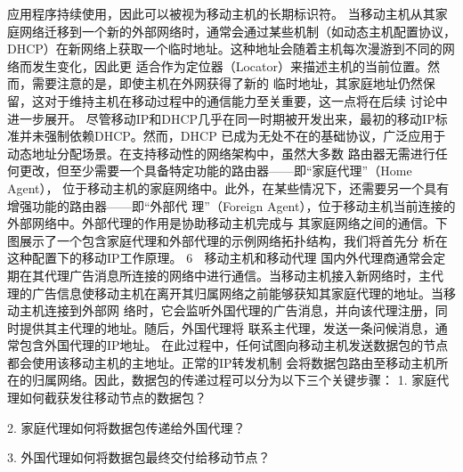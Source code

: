 应用程序持续使用，因此可以被视为移动主机的长期标识符。
当移动主机从其家庭网络迁移到一个新的外部网络时，通常会通过某些机制（如动态主机配置协议，
DHCP）在新网络上获取一个临时地址。这种地址会随着主机每次漫游到不同的网络而发生变化，因此更
适合作为定位器（Locator）来描述主机的当前位置。然而，需要注意的是，即使主机在外网获得了新的
临时地址，其家庭地址仍然保留，这对于维持主机在移动过程中的通信能力至关重要，这一点将在后续
讨论中进一步展开。
尽管移动IP和DHCP几乎在同一时期被开发出来，最初的移动IP标准并未强制依赖DHCP。然而，DHCP
已成为无处不在的基础协议，广泛应用于动态地址分配场景。在支持移动性的网络架构中，虽然大多数
路由器无需进行任何更改，但至少需要一个具备特定功能的路由器——即“家庭代理”（Home Agent），
位于移动主机的家庭网络中。此外，在某些情况下，还需要另一个具有增强功能的路由器——即“外部代
理”（Foreign Agent），位于移动主机当前连接的外部网络中。外部代理的作用是协助移动主机完成与
其家庭网络之间的通信。下图展示了一个包含家庭代理和外部代理的示例网络拓扑结构，我们将首先分
析在这种配置下的移动IP工作原理。
                                                        6
                   移动主机和移动代理
国内外代理商通常会定期在其代理广告消息所连接的网络中进行通信。当移动主机接入新网络时，主代
理的广告信息使移动主机在离开其归属网络之前能够获知其家庭代理的地址。当移动主机连接到外部网
络时，它会监听外国代理的广告消息，并向该代理注册，同时提供其主代理的地址。随后，外国代理将
联系主代理，发送一条问候消息，通常包含外国代理的IP地址。
在此过程中，任何试图向移动主机发送数据包的节点都会使用该移动主机的主地址。正常的IP转发机制
会将数据包路由至移动主机所在的归属网络。因此，数据包的传递过程可以分为以下三个关键步骤：
 1. 家庭代理如何截获发往移动节点的数据包？

 2. 家庭代理如何将数据包传递给外国代理？

 3. 外国代理如何将数据包最终交付给移动节点？


